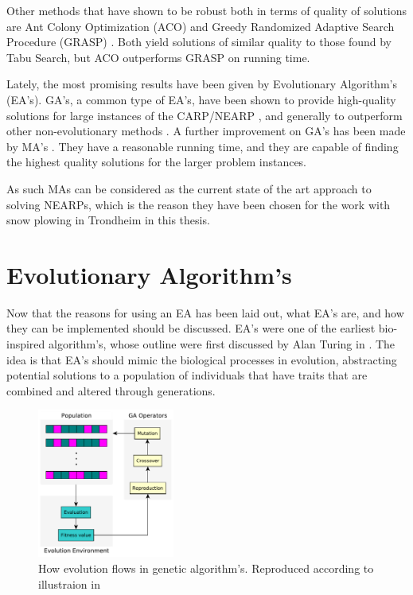 Other methods that have shown to be robust both in terms of quality of solutions are Ant Colony Optimization (ACO) \citep{santos2010ACO} and Greedy Randomized Adaptive Search Procedure (GRASP) \citep{usberti2013grasp}. Both yield solutions of similar quality to those found by Tabu Search, but ACO outperforms GRASP on running time.

Lately, the most promising results have been given by Evolutionary Algorithm's (EA's). GA's, a common type of EA's, have been shown to provide high-quality solutions for large instances of the CARP/NEARP \citep{lacomme2001GA}, and generally to outperform other non-evolutionary methods \citep{wohlk2008decade}. A further improvement on GA's has been made by MA's \citep{prins2005memeticNEARP}. They have a reasonable running time, and they are capable of finding the highest quality solutions for the larger problem instances.

As such MAs can be considered as the current state of the art approach to solving NEARPs, which is the reason they have been chosen for the work with snow plowing in Trondheim in this thesis.



\section{Evolutionary Algorithm's} %
\label{sec:evolutionary_algorithms}
Now that the reasons for using an EA has been laid out, what EA's are, and how they can be implemented should be discussed. EA's were one of the earliest bio-inspired algorithm's, whose outline were first discussed by Alan Turing in \citet{turing1950computing}. The idea is that EA's should mimic the biological processes in evolution, abstracting potential solutions to a population of individuals that have traits that are combined and altered through generations.


\begin{figure}
    \begin{center}
        \includegraphics[width=0.4\textwidth]{figures/GA_general_flow_illustration.pdf}
    \end{center}
    \caption{How evolution flows in genetic algorithm's. Reproduced according to illustraion in \citet{gaFlowIllustrationSource}}
    \label{fig:ga_flow_illustraion}
\end{figure}


